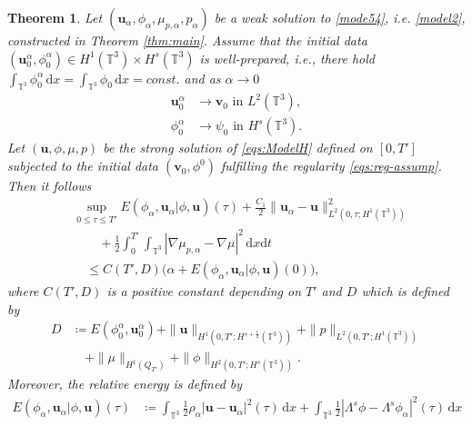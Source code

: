 \documentclass[reqno,a4paper,11pt]{amsart}
\theoremstyle{plain}
\newtheorem{theorem}{Theorem}[section]
\numberwithin{equation}{section}
\newcommand{\bb}[1]{\mathbb{#1}}
\newcommand{\bbt}{\bb{T}}
\newcommand{\bu}{\mathbf{u}}
\newcommand{\bv}{\mathbf{v}}
\renewcommand{\d}{\mathrm{d}}
\newcommand{\dx}{\d x}
\newcommand{\dt}{\d t}
\begin{document}
							\begin{theorem}
								\label{thm:limit}
								Let $(\mathbf{u}_{\alpha},\phi_{\alpha}, \mu_{p,\alpha},p_{\alpha})$ be a weak solution to \eqref{mode54}, i.e. \eqref{model2}, constructed in Theorem \ref{thm:main}. Assume that the initial data $(\bu_0^\alpha,\phi_0^\alpha) \in H^1(\bbt^3) \times H^{s}(\bbt^3)$ is well-prepared, i.e., there hold
								$\int_{\bbt^3} \phi_0^\alpha \,\dx = \int_{\bbt^3} \phi_0 \,\dx = const.$ and as $\alpha\rightarrow 0$ 
								\begin{align}
									\bu_0^\alpha & \to \bv_0 \text{ in } L^2(\bbt^3),\label{wp-1} \\
									\phi_0^\alpha & \to \psi_0 \text{ in } H^s(\bbt^3).\label{wp-2}
								\end{align}
								Let $(\mathbf{u},\phi, \mu,p)$ be the strong solution of \eqref{eqs:ModelH} defined on $[0,T']$ subjected to the initial data $(\mathbf{v}_{0},\phi^{0})$ fulfilling the regularity \eqref{eqs:reg-assump}. Then it follows
								\begin{align}
									&\nonumber \sup_{0\leq \tau \leq T'}E(\phi_{\alpha},\mathbf{u}_{\alpha}|\phi,\mathbf{u})(\tau)
									+  \frac{ C_1}{2} \| \mathbf{u}_{\alpha}-\mathbf{u}\|_{L^2(0,\tau;H^{1}(\mathbb{T}^{3}))}^{2}
									\\&
									\nonumber\qquad +\frac{1}{2}\int_0^{T'}\int_{\mathbb{T}^{3}}|\nabla \mu_{p,\alpha}-\nabla \mu|^{2}\,\dx\dt
									\\&\quad
									\leq C(T',D)\bigg(\alpha+ E(\phi_{\alpha},\mathbf{u}_{\alpha}|\phi,\mathbf{u})(0)\bigg),
									\label{th5.1}
								\end{align}
								where $C(T',D)$ is a positive constant depending on $T'$ and $D$ which is defined by
								\begin{align}
									D&\coloneqq E(\phi_{0}^{\alpha},\mathbf{u}_{0}^{\alpha})+\| \mathbf{u}\|_{H^{1}(0,T';H^{s+\frac{1}{2}}(\mathbb{T}^{3}))}+\| p\|_{L^{2}(0,T';H^{1}(\mathbb{T}^{3}))}\nonumber
									\\&\quad+\|\mu\|_{H^{1}(Q_{T'})}+\|\phi\|_{H^2(0,T';H^{s}(\mathbb{T}^{3}))}.\label{def D}
								\end{align}
								Moreover, the relative energy is defined by
								\begin{align}
									\nonumber E(\phi_{\alpha},\mathbf{u}_{\alpha}|\phi,\mathbf{u})(\tau)&\coloneqq\int_{\mathbb{T}^{3}}\frac{1}{2}\rho_{\alpha}|\mathbf{u}-\mathbf{u}_{\alpha}|^{2}(\tau)\,\dx
									+\int_{\mathbb{T}^{3}}\frac{1}{2}|\Lambda^{s}\phi-\Lambda^{s}\phi_{\alpha}|^{2}(\tau)\,\dx

\end{align}
\end{theorem}
\end{document}

